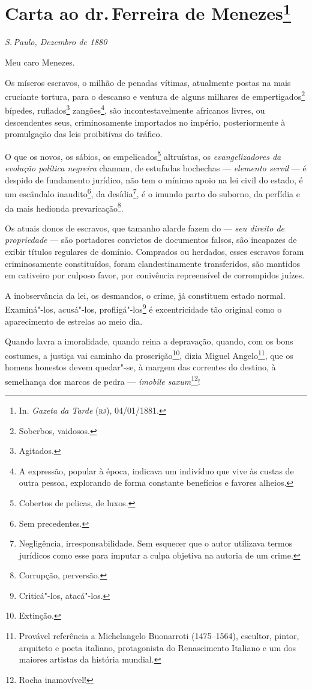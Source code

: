 \chapter{Carta ao dr.\,Ferreira de Menezes\footnote[*]{In.
  \emph{Gazeta da Tarde} (\textsc{rj}), 04/01/1881.}}

\hfill\emph{S.\,Paulo, Dezembro de 1880}\bigskip

\noindent{}Meu caro Menezes.\smallskip

Os míseros escravos, o milhão de penadas vítimas, atualmente postas na
mais cruciante tortura, para o descanso e ventura de alguns milhares de
empertigados\footnote{Soberbos, vaidosos.} bípedes, ruflados\footnote{
  Agitados.} zangões\footnote{A expressão, popular à época, indicava
  um indivíduo que vive às custas de outra pessoa, explorando de forma
  constante benefícios e favores alheios.}, são incontestavelmente
africanos livres, ou descendentes seus, criminosamente importados no
império, posteriormente à promulgação das leis proibitivas do tráfico.

O que os novos, os sábios, os empelicados\footnote{Cobertos de
  pelicas, de luxos.} altruístas, os \emph{evangelizadores da evolução
política negreira} chamam, de estufadas bochechas --- \emph{elemento
servil} --- é despido de fundamento jurídico, não tem o mínimo apoio na
lei civil do estado, é um escândalo inaudito\footnote{Sem precedentes.},
da desídia\footnote{Negligência, irresponsabilidade. Sem esquecer que
  o autor utilizava termos jurídicos como esse para imputar a culpa
  objetiva na autoria de um crime.}, é o imundo parto do suborno, da
perfídia e da mais hedionda prevaricação\footnote{Corrupção,
  perversão.}.

Os atuais donos de escravos, que tamanho alarde fazem do --- \emph{seu
direito de propriedade} --- são portadores convictos de documentos
falsos, são incapazes de exibir títulos regulares de domínio. Comprados
ou herdados, esses escravos foram criminosamente constituídos, foram
clandestinamente transferidos, são mantidos em cativeiro por culposo
favor, por conivência repreensível de corrompidos juízes.

A inobservância da lei, os desmandos, o crime, já constituem estado
normal. Examiná"-los, acusá"-los, profligá"-los\footnote{Criticá"-los,
  atacá"-los.} é excentricidade tão original como o aparecimento de
estrelas ao meio dia.

Quando lavra a imoralidade, quando reina a depravação, quando, com os
bons costumes, a justiça vai caminho da proscrição\footnote{Extinção.},
dizia Miguel Angelo\footnote{Provável referência a Michelangelo
  Buonarroti (1475--1564), escultor, pintor, arquiteto e poeta italiano,
  protagonista do Renascimento Italiano e um dos maiores artistas da
  história mundial.}, que os homens honestos devem quedar"-se, à margem
das correntes do destino, à semelhança dos marcos de pedra ---
\emph{ímobile saxum}\footnote{Rocha inamovível!}!

